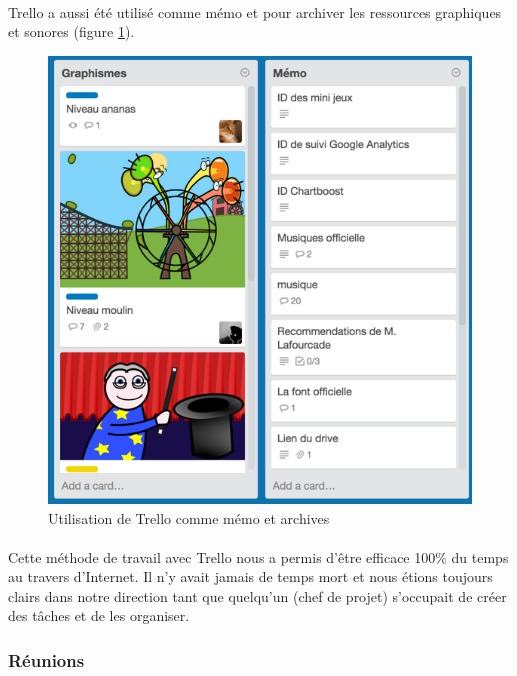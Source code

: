 \paragraph{}
Trello a aussi été utilisé comme mémo et pour archiver les ressources graphiques et sonores (figure \ref{trellomemo}).
 
\begin{figure}[H]\centering
  \includegraphics[scale=1]{./img/trello_autres.png}
  \caption{Utilisation de Trello comme mémo et archives}
  \label{trellomemo}
\end{figure}
 
\paragraph{}
Cette méthode de travail avec Trello nous a permis d’être efficace 100\% du temps au travers d'Internet. Il n’y avait jamais de temps mort et nous étions toujours clairs dans notre direction tant que quelqu’un (chef de projet) s’occupait de créer des tâches et de les organiser.
 
\subsubsection{Réunions}
 

